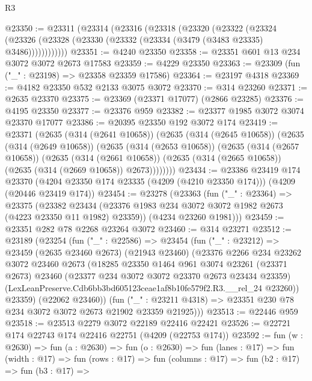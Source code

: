 \begin{lexlean}{R3}
\begin{coremodule}
@23350 := @23311
    (@23314
      (@23316
        (@23318
          (@23320
            (@23322
              (@23324
                (@23326 (@23328 (@23330 (@23332 (@23334 (@3479 (@3483 @23335) @3486))))))))))))
@23351 := @4240 @23350
@23358 := @23351 @601 @13 @234 @3072 @3072 @2673 @17583
@23359 := @4229 @23350
@23363 := @23309 (fun ("_" : @23198) => @23358 @23359 @17586)
@23364 := @23197 @4318
@23369 := @4182 @23350 @532 @2133 @3075 @3072
@23370 := @314 @23260
@23371 := @2635 @23370
@23375 := @23369 (@23371 @17077) (@2866 @23285)
@23376 := @4195 @23350
@23377 := @23376 @959
@23382 := @23377 @1985 @3072 @3074 @23370 @17077
@23386 := @20395 @23350 @192 @3072 @174
@23419 := @23371
    (@2635
      (@314 (@2641 @10658))
      (@2635
        (@314 (@2645 @10658))
        (@2635
          (@314 (@2649 @10658))
          (@2635
            (@314 (@2653 @10658))
            (@2635
              (@314 (@2657 @10658))
              (@2635
                (@314 (@2661 @10658))
                (@2635 (@314 (@2665 @10658)) (@2635 (@314 (@2669 @10658)) @2673))))))))
@23434 := @23386
    @23419
    @174
    @23370
    (@4204 @23350 @174 @23335 (@4209 (@4210 @23350 @174)))
    (@4209 (@20446 @23419 @174))
@23454 := @23278
    (@23363
      (fun ("_" : @23364) =>
      @23375
        (@23382 @23434 (@23376 @1983 @234 @3072 @3072 @1982 @2673 (@4223 @23350 @11 @1982) @23359))
        (@4234 @23260 @1981)))
@23459 := @23351 @282 @78 @2268 @23264 @3072
@23460 := @314 @23271
@23512 := @23189
    (@23254
      (fun ("_" : @22586) =>
      @23454
        (fun ("_" : @23212) =>
        @23459
          (@2635 @23460 @2673)
          (@21943 @23460)
          (@23376
            @2266
            @234
            @23262
            @3072
            @23460
            @2673
            (@18285
              @23350
              @1464
              @961
              @3074
              @23261
              (@23371 @2673)
              @23460
              (@23377 @234 @3072 @3072 @23370 @2673 @23434 @23359)
              (LexLeanPreserve.Cdb6bb3bd605123ceae1af8b10fe579f2.R3.__rel_24 @23260))
            @23359)
          (@22062 @23460))
        (fun ("_" : @23211 @4318) => @23351 @230 @78 @234 @3072 @3072 @2673 @21902 @23359 @21925)))
@23513 := @22446 @959
@23518 := @23513 @2279 @3072 @22189 @22416 @22421
@23526 := @22721 @174 @22743 @174 @22416 @22751 (@4209 (@22753 @174))
@23592 := fun (w : @2630) =>
  fun (a : @2630) =>
  fun (o : @2630) =>
  fun (lanes : @17) =>
  fun (width : @17) =>
  fun (rows : @17) =>
  fun (columns : @17) =>
  fun (b2 : @17) =>
  fun (b3 : @17) =>

\end{coremodule}
\end{lexlean}
